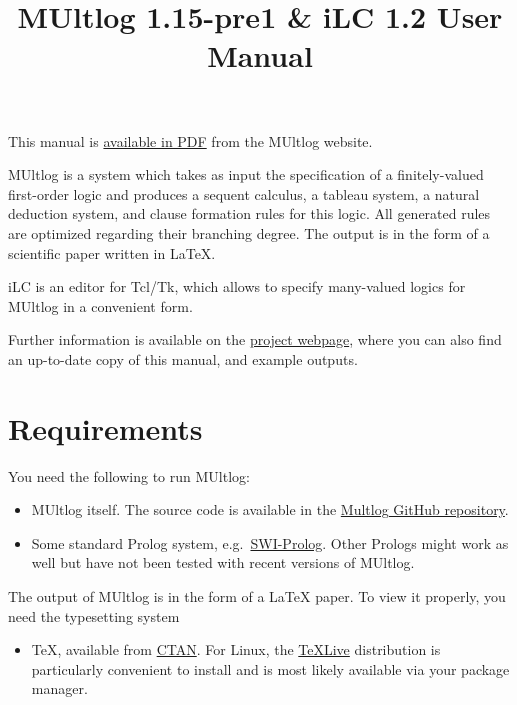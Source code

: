 \documentclass[]{article}
\title{MUltlog 1.15-pre1 \& iLC 1.2 User Manual}
\date{}
\providecommand{\tightlist}{%
  \setlength{\itemsep}{0pt}\setlength{\parskip}{0pt}}
\begin{document}
\maketitle

{
\setcounter{tocdepth}{2}
\tableofcontents
}
This manual is \href{https://logic.at/multlog/multlog.pdf}{available in
PDF} from the MUltlog website.

MUltlog is a system which takes as input the specification of a
finitely-valued first-order logic and produces a sequent calculus, a
tableau system, a natural deduction system, and clause formation rules
for this logic. All generated rules are optimized regarding their
branching degree. The output is in the form of a scientific paper
written in LaTeX.

iLC is an editor for Tcl/Tk, which allows to specify many-valued logics
for MUltlog in a convenient form.

Further information is available on the
\href{http://www.logic.at/multlog/}{project webpage}, where you can also
find an up-to-date copy of this manual, and example outputs.

\hypertarget{requirements}{%
\section{Requirements}\label{requirements}}

You need the following to run MUltlog:

\begin{itemize}
\item
  MUltlog itself. The source code is available in the
  \href{https://github.com/rzach/multlog}{Multlog GitHub repository}.
\item
  Some standard Prolog system,
  e.g.~\href{https://www.swi-prolog.org/}{SWI-Prolog}. Other Prologs
  might work as well but have not been tested with recent versions of
  MUltlog.
\end{itemize}

The output of MUltlog is in the form of a LaTeX paper. To view it
properly, you need the typesetting system

\begin{itemize}
\tightlist
\item
  TeX, available from \href{https://ctan.org/}{CTAN}. For Linux, the
  \href{https://www.tug.org/texlive/}{TeXLive} distribution is
  particularly convenient to install and is most likely available via
  your package manager.
\end{itemize}
\end{document}
